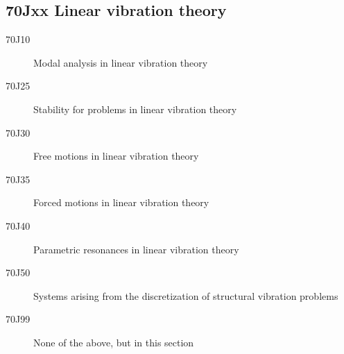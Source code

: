 \subsection*{70Jxx  Linear vibration theory }\label{70Jxx}
\begin{description}  
\item [70J10]\label{70J10} Modal analysis in linear vibration theory
\item [70J25]\label{70J25} Stability for problems in linear vibration theory
\item [70J30]\label{70J30} Free motions in linear vibration theory
\item [70J35]\label{70J35} Forced motions in linear vibration theory
\item [70J40]\label{70J40} Parametric resonances in linear vibration theory
\item [70J50]\label{70J50} Systems arising from the discretization of structural vibration problems
\item [70J99]\label{70J99} None of the above, but in this section
\end{description}
